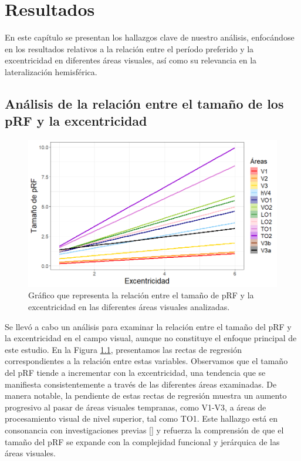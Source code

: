 \chapter{Resultados}\label{chapter:results}

En este cap\'itulo se presentan los hallazgos clave de nuestro análisis, enfocándose en los resultados relativos a la relación entre el per\'iodo preferido y la excentricidad en diferentes áreas visuales, así como su relevancia en la lateralización hemisférica.

\section{Análisis de la relación entre el tamaño de los pRF y la excentricidad}

\begin{figure}[h]
	\centering
	\includegraphics[scale=0.6]{Graphics/size_vs_eccen_bayesian}
	\caption{Gráfico que representa la relación entre el tama\~no de pRF y la excentricidad en las diferentes áreas visuales analizadas.}
	\label{fig:sigma_vs_eccen}
\end{figure}

Se llevó a cabo un análisis para examinar la relación entre el tamaño del pRF y la excentricidad en el campo visual, aunque no constituye el enfoque principal de este estudio. En la Figura \ref{fig:sigma_vs_eccen}, presentamos las rectas de regresión correspondientes a la relaci\'on entre estas variables. Observamos que el tamaño del pRF tiende a incrementar con la excentricidad, una tendencia que se manifiesta consistentemente a través de las diferentes áreas examinadas. De manera notable, la pendiente de estas rectas de regresión muestra un aumento progresivo al pasar de áreas visuales tempranas, como V1-V3, a áreas de procesamiento visual de nivel superior, tal como TO1. Este hallazgo está en consonancia con investigaciones previas [\cite{wandell_computational_2015}] y refuerza la comprensión de que el tamaño del pRF se expande con la complejidad funcional y jerárquica de las áreas visuales.

